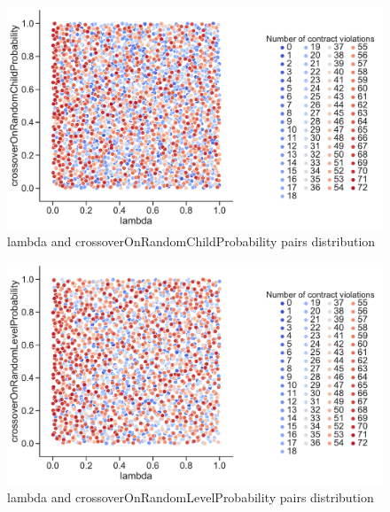 \begin{figure}
	\centering
	\includegraphics[width=\textwidth]{images/PairsDistr/lambda_crossoverOnRandomChildProbability.pdf}
	\caption[lambda and crossoverOnRandomChildProbability pairs distribution]{lambda and crossoverOnRandomChildProbability pairs distribution}
	\label{fig:lambda_crossoverOnRandomChildProbability_pair}
\end{figure}
\begin{figure}
	\centering
	\includegraphics[width=\textwidth]{images/PairsDistr/lambda_crossoverOnRandomLevelProbability.pdf}
	\caption[lambda and crossoverOnRandomLevelProbability pairs distribution]{lambda and crossoverOnRandomLevelProbability pairs distribution}
	\label{fig:lambda_crossoverOnRandomLevelProbability_pair}
\end{figure}
